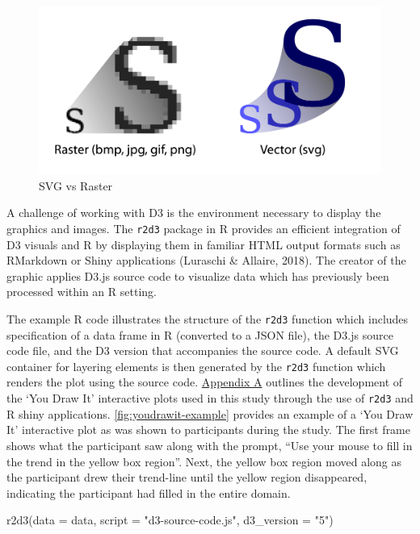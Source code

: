 \documentclass[print]{nuthesis}
\newenvironment{Shaded}{\begin{snugshade}}{\end{snugshade}}
\newcommand{\AttributeTok}[1]{\textcolor[rgb]{0.77,0.63,0.00}{#1}}
\newcommand{\FunctionTok}[1]{\textcolor[rgb]{0.00,0.00,0.00}{#1}}
\newcommand{\NormalTok}[1]{#1}
\newcommand{\StringTok}[1]{\textcolor[rgb]{0.31,0.60,0.02}{#1}}
\begin{document}
\begin{figure}[tbp]

{\centering \includegraphics[width=0.7\linewidth,]{images/02-you-draw-it/raster-vs-vector} 

}

\caption{SVG vs Raster}\label{fig:raster-vs-vector}
\end{figure}

A challenge of working with D3 is the environment necessary to display the graphics and images.
The \texttt{r2d3} package in R provides an efficient integration of D3 visuals and R by displaying them in familiar HTML output formats such as RMarkdown or Shiny applications (Luraschi \& Allaire, 2018).
The creator of the graphic applies D3.js source code to visualize data which has previously been processed within an R setting.

The example R code illustrates the structure of the \texttt{r2d3} function which includes specification of a data frame in R (converted to a JSON file), the D3.js source code file, and the D3 version that accompanies the source code.
A default SVG container for layering elements is then generated by the \texttt{r2d3} function which renders the plot using the source code.
\protect\hyperlink{youdrawit-with-shiny}{Appendix A} outlines the development of the `You Draw It' interactive plots used in this study through the use of \texttt{r2d3} and R shiny applications.
\cref{fig:youdrawit-example} provides an example of a `You Draw It' interactive plot as was shown to participants during the study.
The first frame shows what the participant saw along with the prompt, ``Use your mouse to fill in the trend in the yellow box region''.
Next, the yellow box region moved along as the participant drew their trend-line until the yellow region disappeared, indicating the participant had filled in the entire domain.

\begin{Shaded}
\begin{Highlighting}[]
\FunctionTok{r2d3}\NormalTok{(}\AttributeTok{data =}\NormalTok{ data, }\AttributeTok{script =} \StringTok{"d3{-}source{-}code.js"}\NormalTok{,}
    \AttributeTok{d3\_version =} \StringTok{"5"}\NormalTok{)}
\end{Highlighting}
\end{Shaded}
\end{document}
